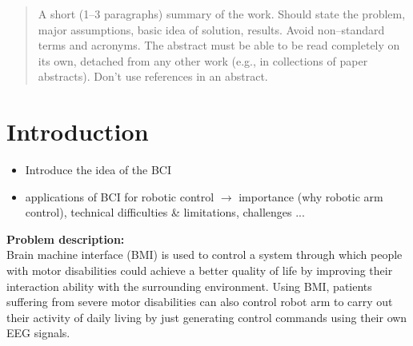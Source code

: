 \documentclass[a4paper,twoside, openright,12pt]{report}
\begin{document}
\newpage


\phantom{u}
\begin{abstract}
  A short (1--3 paragraphs) summary of the work. Should state the problem, major assumptions, basic idea of solution, results. Avoid non--standard terms and acronyms. The abstract must be able to be read completely on its own, detached from any other work (e.g., in collections of paper abstracts). Don't use references in an abstract.
\end{abstract}

\newpage

\phantom{u}
\phantom{1}\vspace{6cm}
\begin{center}
\end{center}



\pagestyle{fancy}

\tableofcontents	



\chapter{Introduction}
\begin{itemize}
	\item Introduce the idea of the BCI
	\item applications of BCI for robotic control
	\subitem $\rightarrow$ importance (why robotic arm control), technical difficulties \& limitations, challenges ...
\end{itemize}

\begin{tcolorbox}
\textbf{Problem description:}\\
Brain machine interface (BMI) is used to control a system through which people with motor
disabilities could achieve a better quality of life by improving their interaction ability with the
surrounding environment. Using BMI, patients suffering from severe motor disabilities can also
control robot arm to carry out their activity of daily living by just generating control commands using
their own EEG signals.
\end{tcolorbox}
\end{document}
